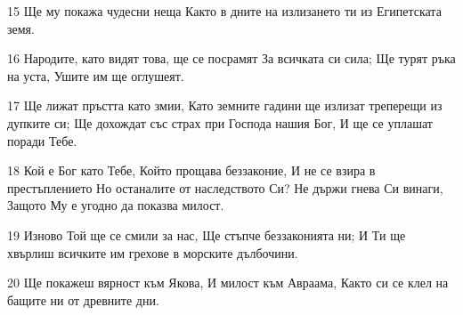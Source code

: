 \par 15 Ще му покажа чудесни неща Както в дните на излизането ти из Египетската земя.
\par 16 Народите, като видят това, ще се посрамят За всичката си сила; Ще турят ръка на уста, Ушите им ще оглушеят.
\par 17 Ще лижат пръстта като змии, Като земните гадини ще излизат треперещи из дупките си; Ще дохождат със страх при Господа нашия Бог, И ще се уплашат поради Тебе.
\par 18 Кой е Бог като Тебе, Който прощава беззаконие, И не се взира в престъплението Но останалите от наследството Си? Не държи гнева Си винаги, Защото Му е угодно да показва милост.
\par 19 Изново Той ще се смили за нас, Ще стъпче беззаконията ни; И Ти ще хвърлиш всичките им грехове в морските дълбочини.
\par 20 Ще покажеш вярност към Якова, И милост към Авраама, Както си се клел на бащите ни от древните дни.


